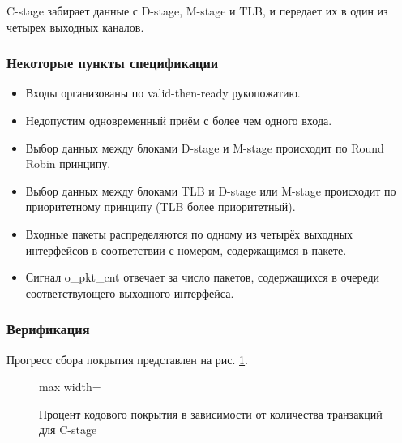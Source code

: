 \tab C-stage забирает данные с D-stage, M-stage и TLB, и передает их в один из четырех выходных каналов. 

\subsubsection*{Некоторые пункты спецификации}

\begin{itemize}
    \item Входы организованы по valid-then-ready рукопожатию. 
    \item Недопустим одновременный приём с более чем одного входа.
    \item Выбор данных между блоками D-stage и M-stage происходит по Round Robin принципу.
    \item Выбор данных между блоками TLB и D-stage или M-stage происходит по приоритетному принципу (TLB более приоритетный).
    \item Входные пакеты распределяются по одному из четырёх выходных интерфейсов в соответствии с номером, содержащимся в пакете.
    \item Сигнал o\_pkt\_cnt отвечает за число пакетов, содержащихся в очереди соответствующего выходного интерфейса.
\end{itemize}

\subsubsection*{Верификация}

\tab Прогресс сбора покрытия представлен на рис. \ref{fig:cov_c}.

\begin{figure}[h]
	\centering
		\begin{adjustbox}{max width=\textwidth}
		\end{adjustbox}
		\caption{Процент кодового покрытия в зависимости от количества транзакций для C-stage}
		\label{fig:cov_c}
\end{figure}

